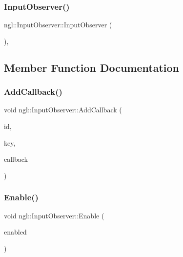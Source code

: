 \mbox{\label{classngl_1_1_input_observer_a51f0ac967cb709eae136014bd1d5173f}} 
\subsubsection{\texorpdfstring{Input\+Observer()}{InputObserver()}}
{\footnotesize\ttfamily ngl\+::\+Input\+Observer\+::\+Input\+Observer (\begin{DoxyParamCaption}{ }\end{DoxyParamCaption})\hspace{0.3cm}{\ttfamily [explicit]}, {\ttfamily [protected]}}



\subsection{Member Function Documentation}
\mbox{\label{classngl_1_1_input_observer_ab6ebe897b73c426665ccd58548933135}} 
\subsubsection{\texorpdfstring{Add\+Callback()}{AddCallback()}}
{\footnotesize\ttfamily void ngl\+::\+Input\+Observer\+::\+Add\+Callback (\begin{DoxyParamCaption}\item[{const std\+::string \&}]{id,  }\item[{\mbox{\hyperlink{namespacengl_a5b20ff50635da5e3adb6bec00c062497}{Event\+Key\+\_\+T}}}]{key,  }\item[{std\+::function$<$ void()$>$}]{callback }\end{DoxyParamCaption})}

\mbox{\label{classngl_1_1_input_observer_a2223a29f34421893ba40304cbdc5d1cf}} 
\subsubsection{\texorpdfstring{Enable()}{Enable()}}
{\footnotesize\ttfamily void ngl\+::\+Input\+Observer\+::\+Enable (\begin{DoxyParamCaption}\item[{const bool}]{enabled }\end{DoxyParamCaption})\hspace{0.3cm}{\ttfamily [virtual]}}


